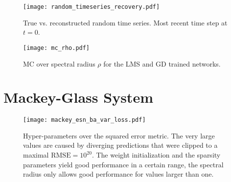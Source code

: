 \begin{figure}
  \begin{minipage}[t]{.48\textwidth}
    \texttt{[image: random\_timeseries\_recovery.pdf]}
    \caption{
      True vs. reconstructed random time series. Most recent time step at $t=0$.
    }
    \label{fig:random_timeseries_recovery}
  \end{minipage}
  \hspace{.02\textwidth}
  \begin{minipage}[t]{.48\textwidth}
    \texttt{[image: mc\_rho.pdf]}
    \caption{MC over spectral radius $\rho$ for the LMS and GD trained networks.}
    \label{fig:mc_rho}
  \end{minipage}
\end{figure}



\newpage
\section{Mackey-Glass System}%
\label{sec:res_mackey_glass_system}

\begin{figure}
  \centering
  \texttt{[image: mackey\_esn\_ba\_var\_loss.pdf]}
  \caption{Hyper-parameters over the squared error metric. The very large
    values are caused by diverging predictions that were clipped to a maximal
    $\mathrm{RMSE}=10^{20}$. The weight initialization and the sparsity
    parameters yield good performance in a certain range, the spectral radius
  only allows good performance for values larger than one.}
  \label{fig:mackey_esn_ba_var_loss}
\end{figure}


